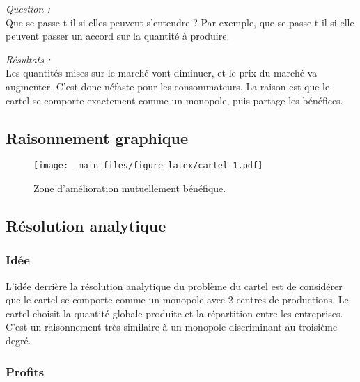 \documentclass[
]{book}
\theoremstyle{definition}
\theoremstyle{definition}
\theoremstyle{definition}
\theoremstyle{definition}
\theoremstyle{remark}
\begin{document}
\emph{Question :}\\
Que se passe-t-il si elles peuvent s'entendre ?
Par exemple, que se passe-t-il si elle peuvent passer un accord sur la quantité à produire.

\emph{Résultats :}\\
Les quantités mises sur le marché vont diminuer, et le prix du marché va augmenter.
C'est donc néfaste pour les consommateurs.
La raison est que le cartel se comporte exactement comme un monopole, puis partage les bénéfices.

\hypertarget{raisonnement-graphique}{%
\subsection{Raisonnement graphique}\label{raisonnement-graphique}}

\begin{figure}
\centering
\texttt{[image: \_main\_files/figure-latex/cartel-1.pdf]}
\caption{\label{fig:cartel}Zone d'amélioration mutuellement bénéfique.}
\end{figure}

\hypertarget{ruxe9solution-analytique}{%
\subsection{Résolution analytique}\label{ruxe9solution-analytique}}

\hypertarget{iduxe9e}{%
\subsubsection{Idée}\label{iduxe9e}}

L'idée derrière la résolution analytique du problème du cartel est de considérer que le cartel se comporte comme un monopole avec 2 centres de productions.
Le cartel choisit la quantité globale produite et la répartition entre les entreprises.
C'est un raisonnement très similaire à un monopole discriminant au troisième degré.

\hypertarget{profits-2}{%
\subsubsection{Profits}\label{profits-2}}
\end{document}
